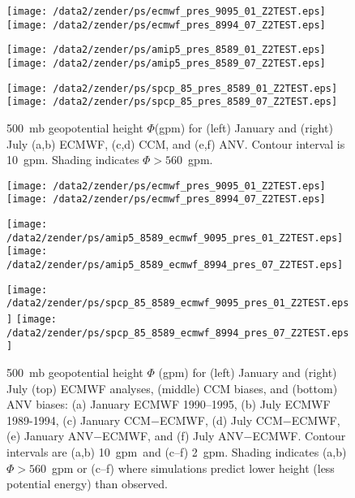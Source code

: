 \documentclass[twocolumn,final]{article}
\begin{document}
\begin{figure*}
\begin{center}
\texttt{[image: /data2/zender/ps/ecmwf\_pres\_9095\_01\_Z2TEST.eps]}%
\texttt{[image: /data2/zender/ps/ecmwf\_pres\_8994\_07\_Z2TEST.eps]}%

\texttt{[image: /data2/zender/ps/amip5\_pres\_8589\_01\_Z2TEST.eps]}%
\texttt{[image: /data2/zender/ps/amip5\_pres\_8589\_07\_Z2TEST.eps]}%

\texttt{[image: /data2/zender/ps/spcp\_85\_pres\_8589\_01\_Z2TEST.eps]}%
\texttt{[image: /data2/zender/ps/spcp\_85\_pres\_8589\_07\_Z2TEST.eps]}%
\end{center}
\caption[500~mb geopotential height $\Phi$ for January and
July ECMWF, CCM, and ANV]{
500~mb geopotential height $\Phi$(gpm) for (left) January and
(right) July (a,b) ECMWF, (c,d) CCM, and (e,f) ANV.
Contour interval is 10~gpm. 
Shading indicates $\Phi > 560$~gpm.
\label{fig:pres_8589_Z2TEST}}
\end{figure*}
\clearpage

\begin{figure*}
\begin{center}
\texttt{[image: /data2/zender/ps/ecmwf\_pres\_9095\_01\_Z2TEST.eps]}%
\texttt{[image: /data2/zender/ps/ecmwf\_pres\_8994\_07\_Z2TEST.eps]}%

\texttt{[image: /data2/zender/ps/amip5\_8589\_ecmwf\_9095\_pres\_01\_Z2TEST.eps]}%
\texttt{[image: /data2/zender/ps/amip5\_8589\_ecmwf\_8994\_pres\_07\_Z2TEST.eps]}%

\texttt{[image: /data2/zender/ps/spcp\_85\_8589\_ecmwf\_9095\_pres\_01\_Z2TEST.eps]}%
\texttt{[image: /data2/zender/ps/spcp\_85\_8589\_ecmwf\_8994\_pres\_07\_Z2TEST.eps]}%
\end{center}
\caption[500~mb geopotential height $\Phi$ for January
and July ECMWF analyses, CCM biases, and ANV biases]{
500~mb geopotential height $\Phi$ (gpm) for (left) January
and (right) July (top) ECMWF analyses, (middle) CCM biases, and (bottom)
ANV biases: (a) January ECMWF 1990--1995, (b) July ECMWF 1989-1994,
(c) January CCM$-$ECMWF, (d) July CCM$-$ECMWF, (e) January
ANV$-$ECMWF, and (f) July ANV$-$ECMWF.
Contour intervals are (a,b) 10~gpm\ and (c--f) 2~gpm.
Shading indicates (a,b) $\Phi > 560$~gpm or (c--f) where simulations 
predict lower height (less potential energy) than observed. 
\label{fig:pres_8589_Z2TEST}}   
\end{figure*}
\clearpage
\end{document}
